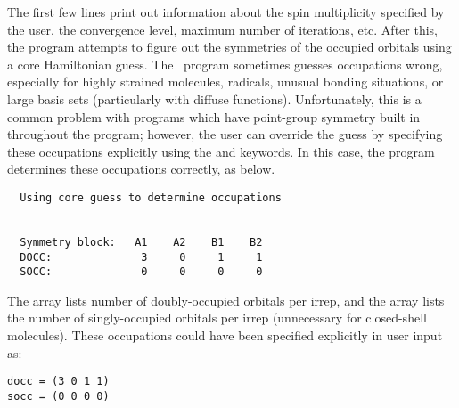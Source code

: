 The first few lines print out information about the spin multiplicity
specified by the user, the convergence level, maximum number of iterations,
etc.  After this, the program attempts to figure out the symmetries
of the occupied orbitals using a core Hamiltonian guess.  The \PSIcscf\
program sometimes guesses occupations wrong, especially for highly strained
molecules, radicals, unusual bonding situations, or large basis sets
(particularly with diffuse functions).  Unfortunately, this is a common 
problem with programs which have point-group symmetry built in throughout the 
program; however, the user can override the guess by specifying these
occupations explicitly using the \keyword{docc} and \keyword{socc} keywords.
In this case, the program determines these occupations correctly, as
below.
\begin{verbatim}
  Using core guess to determine occupations
                                                                                
                                                                                
  Symmetry block:   A1    A2    B1    B2
  DOCC:              3     0     1     1
  SOCC:              0     0     0     0
\end{verbatim}
The  array lists number of doubly-occupied orbitals per
irrep, and the \keyword{SOCC} array lists the number of singly-occupied
orbitals per irrep (unnecessary for closed-shell molecules).  These
occupations could have been specified explicitly in user input as:
\begin{verbatim}
docc = (3 0 1 1)
socc = (0 0 0 0)
\end{verbatim}

